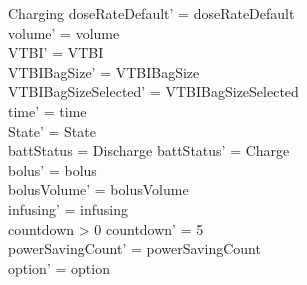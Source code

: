 \begin{schema}{Charging}
	doseRateDefault' = doseRateDefault\\
	\pagebreak
	volume' = volume\\
	VTBI' = VTBI\\
	VTBIBagSize' = VTBIBagSize\\ VTBIBagSizeSelected' = VTBIBagSizeSelected\\
	time' = time\\ State' = State\\
	battStatus = Discharge \land battStatus' = Charge\\
	bolus' = bolus\\
	bolusVolume' = bolusVolume\\
	infusing' = infusing\\
	countdown > 0 \land countdown' = 5\\
	powerSavingCount' = powerSavingCount\\ option' = option\\
\end{schema}


